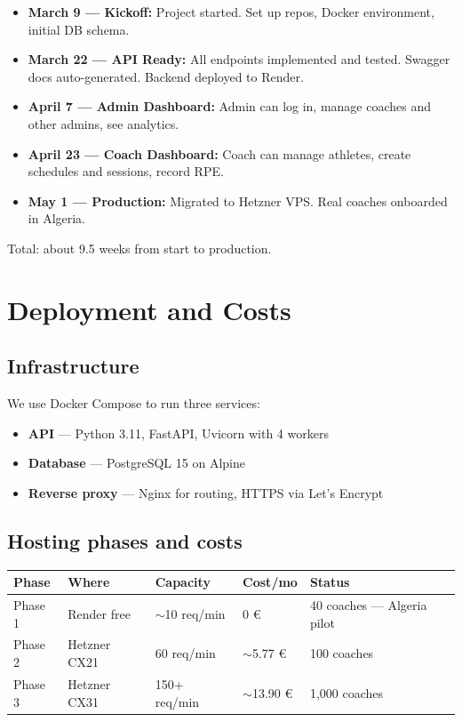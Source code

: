 \documentclass[11pt,a4paper]{article}
\newcommand{\hrow}{\rowcolor{Black}\color{White}\bfseries}
\newcommand{\altrow}{\rowcolor{OffWhite}}
\begin{document}
\begin{itemize}
  \item \textbf{March 9 — Kickoff:} Project started. Set up repos, Docker environment, initial DB schema.
  \item \textbf{March 22 — API Ready:} All endpoints implemented and tested. Swagger docs auto-generated. Backend deployed to Render.
  \item \textbf{April 7 — Admin Dashboard:} Admin can log in, manage coaches and other admins, see analytics.
  \item \textbf{April 23 — Coach Dashboard:} Coach can manage athletes, create schedules and sessions, record RPE.
  \item \textbf{May 1 — Production:} Migrated to Hetzner VPS. Real coaches onboarded in Algeria.
\end{itemize}

Total: about 9.5 weeks from start to production.

\newpage

\section{Deployment and Costs}

\subsection{Infrastructure}

We use Docker Compose to run three services:
\begin{itemize}
  \item \textbf{API} — Python 3.11, FastAPI, Uvicorn with 4 workers
  \item \textbf{Database} — PostgreSQL 15 on Alpine
  \item \textbf{Reverse proxy} — Nginx for routing, HTTPS via Let's Encrypt
\end{itemize}

\subsection{Hosting phases and costs}

\begin{tabularx}{\linewidth}{L{2.8cm} L{2.5cm} L{2.5cm} L{2cm} X}
\toprule
\hrow Phase & Where & Capacity & Cost/mo & Status \\
\midrule
Phase 1 & Render free & $\sim$10 req/min & 0 € & 40 coaches — Algeria pilot \\
\altrow Phase 2 & Hetzner CX21 & 60 req/min & $\sim$5.77 € & 100 coaches \\
Phase 3 & Hetzner CX31 & 150+ req/min & $\sim$13.90 € & 1,000 coaches \\
\bottomrule
\end{tabularx}
\end{document}

